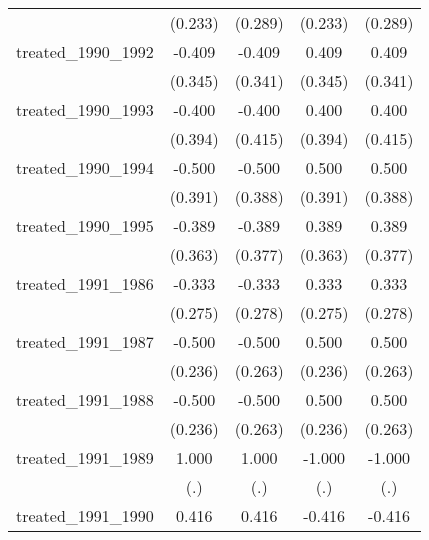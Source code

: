 {\begin{tabular}{l*{4}{c}}
            &     (0.233)         &     (0.289)         &     (0.233)         &     (0.289)         \\
[1em]
treated\_1990\_1992&      -0.409         &      -0.409         &       0.409         &       0.409         \\
            &     (0.345)         &     (0.341)         &     (0.345)         &     (0.341)         \\
[1em]
treated\_1990\_1993&      -0.400         &      -0.400         &       0.400         &       0.400         \\
            &     (0.394)         &     (0.415)         &     (0.394)         &     (0.415)         \\
[1em]
treated\_1990\_1994&      -0.500         &      -0.500         &       0.500         &       0.500         \\
            &     (0.391)         &     (0.388)         &     (0.391)         &     (0.388)         \\
[1em]
treated\_1990\_1995&      -0.389         &      -0.389         &       0.389         &       0.389         \\
            &     (0.363)         &     (0.377)         &     (0.363)         &     (0.377)         \\
[1em]
treated\_1991\_1986&      -0.333         &      -0.333         &       0.333         &       0.333         \\
            &     (0.275)         &     (0.278)         &     (0.275)         &     (0.278)         \\
[1em]
treated\_1991\_1987&      -0.500\sym{*}  &      -0.500         &       0.500\sym{*}  &       0.500         \\
            &     (0.236)         &     (0.263)         &     (0.236)         &     (0.263)         \\
[1em]
treated\_1991\_1988&      -0.500\sym{*}  &      -0.500         &       0.500\sym{*}  &       0.500         \\
            &     (0.236)         &     (0.263)         &     (0.236)         &     (0.263)         \\
[1em]
treated\_1991\_1989&       1.000         &       1.000         &      -1.000         &      -1.000         \\
            &         (.)         &         (.)         &         (.)         &         (.)         \\
[1em]
treated\_1991\_1990&       0.416\sym{**} &       0.416\sym{*}  &      -0.416\sym{**} &      -0.416\sym{*}  \\

\end{tabular}}
